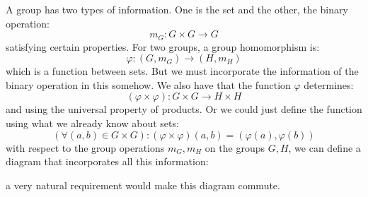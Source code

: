 \documentclass{report}
\begin{document}
A group has two types of information. One is the set and the other, the binary operation:
    \begin{equation*}
        m_{G} : G \times G \rightarrow G
    \end{equation*}
satisfying certain properties. For two groups, a group homomorphism is:
    \begin{equation*}
        \varphi : (G, m_{G}) \rightarrow (H, m_{H})
    \end{equation*}
which is a function between sets. But we must incorporate the information of the binary operation in this somehow. We also have that the function $\varphi$ determines:
    \begin{equation*}
        (\varphi \times \varphi) : G \times G \rightarrow H \times H
    \end{equation*}
and using the universal property of products. Or we could just define the function using what we already know about sets:
    \begin{equation*}
        (\forall (a, b) \in G \times G): (\varphi \times \varphi)(a, b) = (\varphi(a), \varphi(b))
    \end{equation*}
with respect to the group operations $m_{G}, m_{H}$ on the groups $G, H$, we can define a diagram that incorporates all this information:
    \begin{center}
    \end{center}
a very natural requirement would make this diagram commute.
\end{document}
